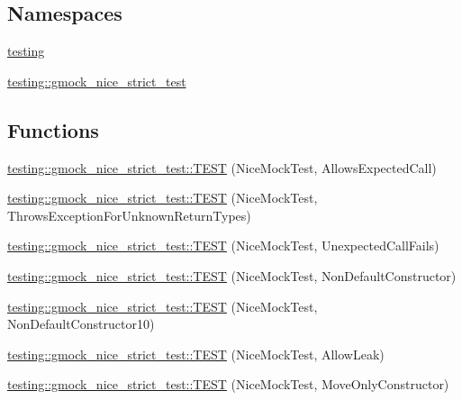 \subsection*{Namespaces}
\begin{DoxyCompactItemize}
\item 
 \mbox{\hyperlink{namespacetesting}{testing}}
\item 
 \mbox{\hyperlink{namespacetesting_1_1gmock__nice__strict__test}{testing\+::gmock\+\_\+nice\+\_\+strict\+\_\+test}}
\end{DoxyCompactItemize}
\subsection*{Functions}
\begin{DoxyCompactItemize}
\item 
\mbox{\hyperlink{namespacetesting_1_1gmock__nice__strict__test_a12b9f686345faa5a646da65a67c38a44}{testing\+::gmock\+\_\+nice\+\_\+strict\+\_\+test\+::\+T\+E\+ST}} (Nice\+Mock\+Test, Allows\+Expected\+Call)
\item 
\mbox{\hyperlink{namespacetesting_1_1gmock__nice__strict__test_af6a34a561886bec5e278239ef65d6011}{testing\+::gmock\+\_\+nice\+\_\+strict\+\_\+test\+::\+T\+E\+ST}} (Nice\+Mock\+Test, Throws\+Exception\+For\+Unknown\+Return\+Types)
\item 
\mbox{\hyperlink{namespacetesting_1_1gmock__nice__strict__test_a2bad58b3a12ea95eb4a731026c576b40}{testing\+::gmock\+\_\+nice\+\_\+strict\+\_\+test\+::\+T\+E\+ST}} (Nice\+Mock\+Test, Unexpected\+Call\+Fails)
\item 
\mbox{\hyperlink{namespacetesting_1_1gmock__nice__strict__test_a4172e1193c21d61e34d9b2c379d2f6be}{testing\+::gmock\+\_\+nice\+\_\+strict\+\_\+test\+::\+T\+E\+ST}} (Nice\+Mock\+Test, Non\+Default\+Constructor)
\item 
\mbox{\hyperlink{namespacetesting_1_1gmock__nice__strict__test_a81bfeea94824935648545225f5dd3c00}{testing\+::gmock\+\_\+nice\+\_\+strict\+\_\+test\+::\+T\+E\+ST}} (Nice\+Mock\+Test, Non\+Default\+Constructor10)
\item 
\mbox{\hyperlink{namespacetesting_1_1gmock__nice__strict__test_a49fd5610815a7ced633a1c8ac3f62709}{testing\+::gmock\+\_\+nice\+\_\+strict\+\_\+test\+::\+T\+E\+ST}} (Nice\+Mock\+Test, Allow\+Leak)
\item 
\mbox{\hyperlink{namespacetesting_1_1gmock__nice__strict__test_ade923493d5669e4ae63e1dd6a7e3d92d}{testing\+::gmock\+\_\+nice\+\_\+strict\+\_\+test\+::\+T\+E\+ST}} (Nice\+Mock\+Test, Move\+Only\+Constructor)

\end{DoxyCompactItemize}

